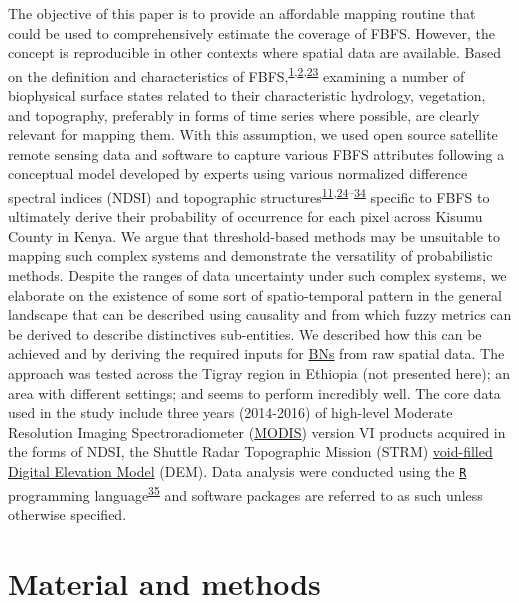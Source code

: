 \documentclass[12pt,oneside]{article}
\begin{document}
The objective of this paper is to provide an affordable mapping routine that could be used to comprehensively estimate the coverage of FBFS. However, the concept is reproducible in other contexts where spatial data are available. Based on the definition and characteristics of FBFS,\textsuperscript{\protect\hyperlink{ref-Puertas_et_al_2011}{1},\protect\hyperlink{ref-VanSteenbergen_et_al_2010}{2},\protect\hyperlink{ref-VanSteenbergen_et_al_2011}{23}} examining a number of biophysical surface states related to their characteristic hydrology, vegetation, and topography, preferably in forms of time series where possible, are clearly relevant for mapping them. With this assumption, we used open source satellite remote sensing data and software to capture various FBFS attributes following a conceptual model developed by experts using various normalized difference spectral indices (NDSI) and topographic structures\textsuperscript{\protect\hyperlink{ref-Wegmann_et_al_2016}{11},\protect\hyperlink{ref-Arge_et_al_2003}{24}--\protect\hyperlink{ref-Yang_et_al_2006}{34}} specific to FBFS to ultimately derive their probability of occurrence for each pixel across Kisumu County in Kenya. We argue that threshold-based methods may be unsuitable to mapping such complex systems and demonstrate the versatility of probabilistic methods. Despite the ranges of data uncertainty under such complex systems, we elaborate on the existence of some sort of spatio-temporal pattern in the general landscape that can be described using causality and from which fuzzy metrics can be derived to describe distinctives sub-entities. We described how this can be achieved and by deriving the required inputs for \href{https://en.wikipedia.org/wiki/Bayesian_network}{BNs} from raw spatial data. The approach was tested across the Tigray region in Ethiopia (not presented here); an area with different settings; and seems to perform incredibly well. The core data used in the study include three years (2014-2016) of high-level Moderate Resolution Imaging Spectroradiometer (\href{https://terra.nasa.gov/about/terra-instruments/modis}{MODIS}) version VI products acquired in the forms of NDSI, the Shuttle Radar Topographic Mission (STRM) \href{http://srtm.csi.cgiar.org/}{void-filled Digital Elevation Model} (DEM). Data analysis were conducted using the \href{https://cran.r-project.org/}{\texttt{R}} programming language\textsuperscript{\protect\hyperlink{ref-RCoreTeam_2018}{35}} and software packages are referred to as such unless otherwise specified.

\hypertarget{I}{%
\section{Material and methods}\label{I}}
\end{document}
